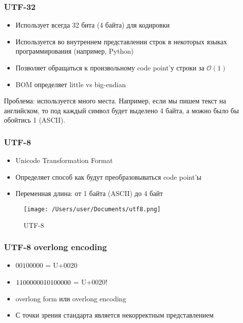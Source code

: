   \subsubsection{UTF-32}
    \begin{itemize}
      \item Использует всегда 32 бита (4 байта) для кодировки
      \item Используется во внутреннем представлении строк в некоторых языках программирования (например, Python)
      \item Позволяет обращаться к произвольному code point'у строки за $\mathcal{O}(1)$
      \item BOM определяет little vs big-endian
    \end{itemize}
    Проблема: используется много места. Например, если мы пишем текст на английском, то под каждый символ будет выделено 4 байта, а можно было бы обойтись 1 (ASCII).
  
  \subsubsection{UTF-8}
    \begin{itemize}
      \item Unicode Transformation Format
      \item Определяет способ как будут преобразовываться code point'ы
      \item Переменная длина: от 1 байта (ASCII) до 4 байт
    \end{itemize}
    
    \begin{figure}[h!]
  \texttt{[image: /Users/user/Documents/utf8.png]}
  \caption{UTF-8}
  \label{fig:utf8}
\end{figure}
  
  \subsubsection*{UTF-8 overlong encoding}
    \begin{itemize}
      \item $00100000$ = U+0020
      \item $11000000 \space 10100000$ = U+0020!
      \item overlong form или overlong encoding
      \item С точки зрения стандарта является некорректным представлением
    \end{itemize}